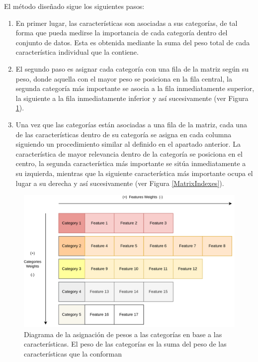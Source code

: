 El método diseñado sigue los siguientes pasos:
\begin{enumerate}
	\item En primer lugar, las características son asociadas a sus categorías, de tal forma que pueda medirse la importancia de cada categoría dentro del conjunto de datos. Esta es obtenida mediante la suma del peso total de cada característica individual que la contiene.
	\item El segundo paso es asignar cada categoría con una fila de la matriz según su peso, donde aquella con el mayor peso se posiciona en la fila central, la segunda categoría más importante se asocia a la fila inmediatamente superior, la siguiente a la fila inmediatamente inferior y así sucesivamente (ver Figura \ref{CategoriesFeaturesWeights}).
	\item Una vez que las categorías están asociadas a una fila de la matriz, cada una de las características dentro de su categoría se asigna en cada columna siguiendo un procedimiento similar al definido en el apartado anterior. La característica de mayor relevancia dentro de la categoría se posiciona en el centro, la segunda característica más importante se sitúa inmediatamente a su izquierda, mientras que la siguiente característica más importante ocupa el lugar a su derecha y así sucesivamente (ver Figura \ref{MatrixIndexes}).
\end{enumerate}


\begin{figure}[H]
	\centering
	\includegraphics[width=12cm]{Figures/indexing_positions_1_2.png}
	\caption{Diagrama de la asignación de pesos a las categorías en base a las características. El peso de las categorías es la suma del peso de las características que la conforman}
	\label{CategoriesFeaturesWeights}
\end{figure}

